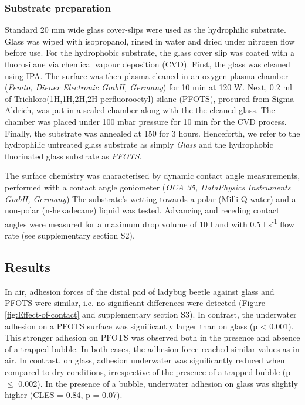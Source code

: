 \documentclass[vruler,JEB]{COB}%
\begin{document}
\subsubsection{Substrate preparation}

Standard 20 mm wide glass cover-slips were used as the hydrophilic
substrate. Glass was wiped with isopropanol, rinsed in water and dried
under nitrogen flow before use. For the hydrophobic substrate, the glass cover slip was coated with
a fluorosilane via chemical vapour deposition (CVD). First, the glass
was cleaned using IPA. The surface was then plasma cleaned in an oxygen
plasma chamber (\emph{Femto, Diener Electronic GmbH, Germany}) for 10 min at 120 W. Next, 0.2 ml of
Trichloro(1H,1H,2H,2H-perfluorooctyl) silane (PFOTS), procured from
Sigma Aldrich, was put in a sealed chamber along with the the cleaned
glass. The chamber was placed under 100 mbar pressure for 10 min for
the CVD process. Finally, the substrate was annealed at 150\textcelsius{}
for 3 hours. Henceforth, we refer to the hydrophilic untreated glass substrate 
as simply \emph{Glass} and the hydrophobic fluorinated glass substrate as \emph{PFOTS}.

The surface chemistry was characterised by dynamic contact angle
measurements, performed with a contact angle goniometer (\emph{OCA 35, DataPhysics Instruments GmbH, Germany})
The substrate's wetting towards a polar (Milli-Q water) and a non-polar (n-hexadecane) liquid was tested. Advancing
and receding contact angles were measured for a maximum drop volume
of 10 \textmu l and with 0.5 \textmu l s\protect\textsuperscript{-1} flow rate (see supplementary section S2).

\subsection{Results}


In air, adhesion forces of the distal pad of ladybug beetle against
glass and PFOTS were similar, i.e. no significant differences were
detected (Figure \ref{fig:Effect-of-contact} and supplementary section S3).
In contrast, the underwater adhesion on a PFOTS surface was significantly
larger than on glass (p < 0.001). This stronger adhesion on PFOTS
was observed both in the presence and absence of a trapped bubble.
In both cases, the adhesion force reached similar values as in air. In contrast,
on glass, adhesion underwater was significantly reduced when compared
to dry conditions, irrespective of the presence of a trapped bubble
(p $\leq$ 0.002). In the presence of a bubble, underwater adhesion on glass was slightly higher (CLES = 0.84, p = 0.07).
\end{document}
